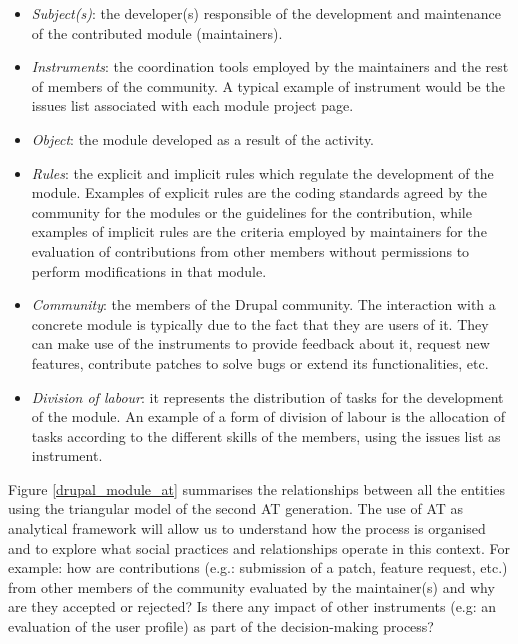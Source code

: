\documentclass{acm_proc_article-sp}
\begin{document}
\begin{itemize}
	\item \textit{Subject(s)}: the developer(s) responsible of the development and maintenance of the contributed module (maintainers).
	\item \textit{Instruments}: the coordination tools employed by the maintainers and the rest of members of the community. A typical example of instrument would be the issues list associated with each module project page.
	\item \textit{Object}: the module developed as a result of the activity.
	\item \textit{Rules}: the explicit and implicit rules which regulate the development of the module. Examples of explicit rules are the coding standards agreed by the community for the modules or the guidelines for the contribution, while examples of implicit rules are the criteria employed by maintainers for the evaluation of contributions from other members without permissions to perform modifications in that module. 
	\item \textit{Community}: the members of the Drupal community. The interaction with a concrete module is typically due to the fact that they are users of it. They can make use of the instruments to provide feedback about it, request new features, contribute patches to solve bugs or extend its functionalities, etc. 
	\item \textit{Division of labour}: it represents the distribution of tasks for the development of the module. An example of a form of division of labour is the allocation of tasks according to the different skills of the members, using the issues list as instrument.
\end{itemize}

Figure \ref{drupal_module_at} summarises the relationships between all the entities using the triangular model of the second AT generation. The use of AT as analytical framework will allow us to understand how the process is organised and to explore what social practices and relationships operate in this context. For example: how are contributions (e.g.: submission of a patch, feature request, etc.) from other members of the community evaluated by the maintainer(s) and why are they accepted or rejected? Is there any impact of other instruments (e.g: an evaluation of the user profile) as part of the decision-making process?
\end{document}
